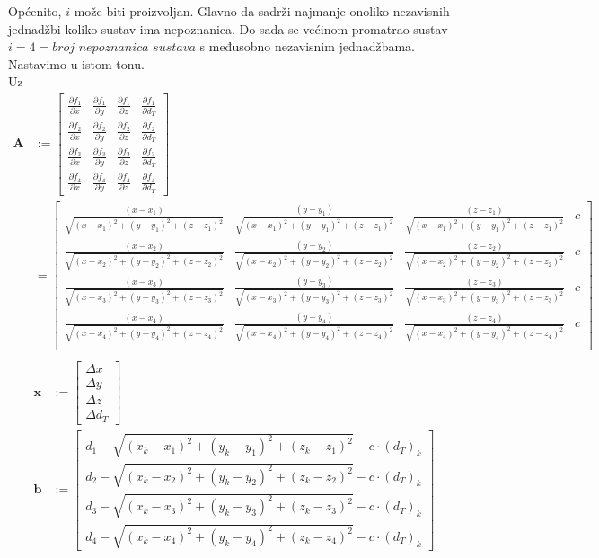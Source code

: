 \documentclass[a4paper,twoside,12pt]{memoir} %
\begin{document}
Općenito, $i$ može biti proizvoljan. 
Glavno da sadrži najmanje onoliko nezavisnih jednadžbi koliko sustav ima nepoznanica.
Do sada se većinom promatrao sustav $i = 4 = \textit{broj nepoznanica sustava}$ s međusobno nezavisnim jednadžbama. Nastavimo u istom tonu.
\\
Uz 
\begin{align*}
\mathbf{A} & := \begin{bmatrix}
\frac{\partial f_1}{\partial x} &
\frac{\partial f_1}{\partial y} &
\frac{\partial f_1}{\partial z} &
\frac{\partial f_1}{\partial d_T} \\
\frac{\partial f_2}{\partial x} &
\frac{\partial f_2}{\partial y} &
\frac{\partial f_2}{\partial z} &
\frac{\partial f_2}{\partial d_T} \\
\frac{\partial f_3}{\partial x} &
\frac{\partial f_3}{\partial y} &
\frac{\partial f_3}{\partial z} &
\frac{\partial f_3}{\partial d_T} \\
\frac{\partial f_4}{\partial x} &
\frac{\partial f_4}{\partial y} &
\frac{\partial f_4}{\partial z} &
\frac{\partial f_4}{\partial d_T}
\end{bmatrix}  \\
& = \begin{bmatrix}
\frac{(x-x_1)}{\sqrt{(x-x_1)^{2}+(y-y_1)^{2}+(z-z_1)^{2}}} & \frac{(y-y_1)}{\sqrt{(x-x_1)^{2}+(y-y_1)^{2}+(z-z_1)^{2}}} & \frac{(z-z_1)}{\sqrt{(x-x_1)^{2}+(y-y_1)^{2}+(z-z_1)^{2}}} & c \\
\frac{(x-x_2)}{\sqrt{(x-x_2)^{2}+(y-y_2)^{2}+(z-z_2)^{2}}} & \frac{(y-y_2)}{\sqrt{(x-x_2)^{2}+(y-y_2)^{2}+(z-z_2)^{2}}} & \frac{(z-z_2)}{\sqrt{(x-x_2)^{2}+(y-y_2)^{2}+(z-z_2)^{2}}} & c \\
\frac{(x-x_3)}{\sqrt{(x-x_3)^{2}+(y-y_3)^{2}+(z-z_3)^{2}}} & \frac{(y-y_3)}{\sqrt{(x-x_3)^{2}+(y-y_3)^{2}+(z-z_3)^{2}}} & \frac{(z-z_3)}{\sqrt{(x-x_3)^{2}+(y-y_3)^{2}+(z-z_3)^{2}}} & c \\
\frac{(x-x_4)}{\sqrt{(x-x_4)^{2}+(y-y_4)^{2}+(z-z_4)^{2}}} & \frac{(y-y_4)}{\sqrt{(x-x_4)^{2}+(y-y_4)^{2}+(z-z_4)^{2}}} & \frac{(z-z_4)}{\sqrt{(x-x_4)^{2}+(y-y_4)^{2}+(z-z_4)^{2}}} & c \\
\end{bmatrix}\\
\end{align*}
\begin{align}
\mathbf{x} & :=  \begin{bmatrix}
\Delta x \\
\Delta y \\
\Delta z \\
\Delta d_T
\end{bmatrix}\\
\mathbf{b} & := \begin{bmatrix}
d_1 - \sqrt{(x_k-x_1)^{2}+(y_k-y_1)^{2}+(z_k-z_1)^{2}} - c\cdot (d_T)_k \\
d_2 - \sqrt{(x_k-x_2)^{2}+(y_k-y_2)^{2}+(z_k-z_2)^{2}} - c\cdot (d_T)_k \\
d_3 - \sqrt{(x_k-x_3)^{2}+(y_k-y_3)^{2}+(z_k-z_3)^{2}} - c\cdot (d_T)_k \\
d_4 - \sqrt{(x_k-x_4)^{2}+(y_k-y_4)^{2}+(z_k-z_4)^{2}} - c\cdot (d_T)_k
\end{bmatrix}
\end{align}
\end{document}
